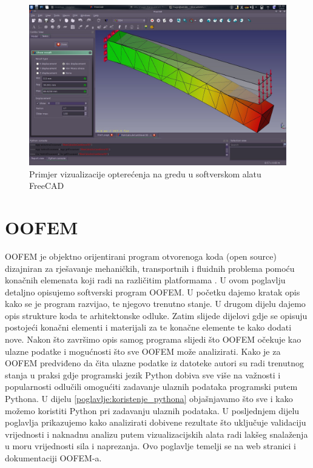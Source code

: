 \documentclass[a4paper,twoside,12pt]{memoir} %
\begin{document}
\begin{figure}[h!t]
\begin{center}
\includegraphics[scale=0.35]{pictures/chapter_fem/FEM_visualization_1.jpg}
\caption{Primjer vizualizacije opterećenja na gredu u softverskom alatu FreeCAD \cite{freefem_wiki_beam}}
\label{fig:freecad_beam}
\end{center}
\end{figure}


\chapter{OOFEM}	
OOFEM je objektno orijentirani program otvorenoga koda (open source) dizajniran za rješavanje mehaničkih, transportnih i fluidnih problema pomoću konačnih elemenata koji radi na različitim platformama \cite{oofem-web}. U ovom poglavlju detaljno opisujemo softverski program OOFEM. U početku dajemo kratak opis kako se je program razvijao, te njegovo trenutno stanje. U drugom dijelu dajemo opis strukture koda te arhitektonske odluke. Zatim slijede dijelovi gdje se opisuju postojeći konačni elementi i materijali za te konačne elemente te kako dodati nove. Nakon što završimo opis samog programa slijedi što OOFEM očekuje kao ulazne podatke i mogućnosti što sve OOFEM može analizirati. Kako je za OOFEM predviđeno da čita ulazne podatke iz datoteke autori su radi trenutnog stanja u praksi gdje programski jezik Python dobiva sve više na važnosti i popularnosti odlučili omogućiti zadavanje ulaznih podataka programski putem Pythona. U dijelu \ref{poglavlje:koristenje_pythona} objašnjavamo što sve i kako možemo koristiti Python pri zadavanju ulaznih podataka. U posljednjem dijelu poglavlja prikazujemo kako analizirati dobivene rezultate što uključuje validaciju vrijednosti i naknadnu analizu putem vizualizacijskih alata radi lakšeg snalaženja u moru vrijednosti sila i naprezanja. Ovo poglavlje temelji se na web stranici i dokumentaciji OOFEM-a. \cite{oofem_article} \cite{oofem-web}
\end{document}
